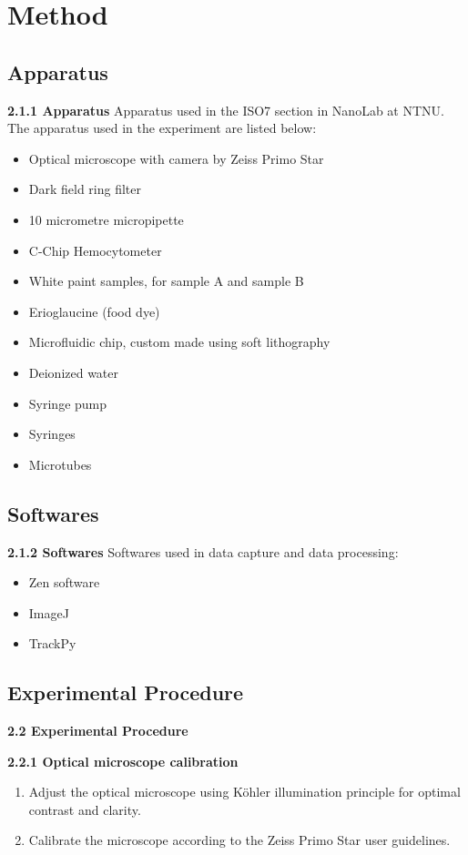 \section{Method}

\subsection{Apparatus}
\textbf{2.1.1 Apparatus}
Apparatus used in the ISO7 section in NanoLab at NTNU. The apparatus used in the experiment are listed below:

\begin{itemize}
    \item Optical microscope with camera by Zeiss Primo Star
    \item Dark field ring filter
    \item 10 micrometre micropipette
    \item C-Chip Hemocytometer
    \item White paint samples, for sample A and sample B
    \item Erioglaucine (food dye)
    \item Microfluidic chip, custom made using soft lithography
    \item Deionized water
    \item Syringe pump
    \item Syringes
    \item Microtubes
\end{itemize}

\subsection{Softwares}
\textbf{2.1.2 Softwares}
Softwares used in data capture and data processing:
\begin{itemize}
    \item Zen software
    \item ImageJ
    \item TrackPy
\end{itemize}

\subsection{Experimental Procedure}
\textbf{2.2 Experimental Procedure}

\textbf{2.2.1 Optical microscope calibration}
\begin{enumerate}
    \item Adjust the optical microscope using Köhler illumination principle for optimal contrast and clarity.
    \item Calibrate the microscope according to the Zeiss Primo Star user guidelines.
\end{enumerate}

